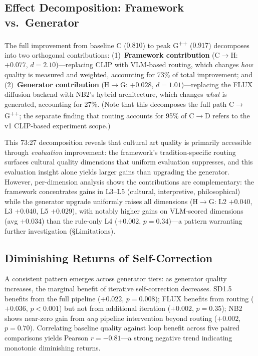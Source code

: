 \documentclass[sigconf, screen, review, anonymous]{acmart}
\newcommand{\Lx}[1]{L#1}
\begin{document}
\subsection{Effect Decomposition: Framework vs.\ Generator}

The full improvement from baseline C ($0.810$) to peak G\textsuperscript{++} ($0.917$) decomposes into two orthogonal contributions:
(1)~\textbf{Framework contribution} (C$\to$H: $+0.077$, $d = 2.10$)---replacing CLIP with VLM-based routing, which changes \emph{how} quality is measured and weighted, accounting for 73\% of total improvement; and
(2)~\textbf{Generator contribution} (H$\to$G: $+0.028$, $d = 1.01$)---replacing the FLUX diffusion backend with NB2's hybrid architecture, which changes \emph{what} is generated, accounting for 27\%.
(Note that this decomposes the full path C$\to$G\textsuperscript{++}; the separate finding that routing accounts for 95\% of C$\to$D refers to the v1 CLIP-based experiment scope.)

This 73:27 decomposition reveals that cultural art quality is primarily accessible through \emph{evaluation} improvement: the framework's tradition-specific routing surfaces cultural quality dimensions that uniform evaluation suppresses, and this evaluation insight alone yields larger gains than upgrading the generator.
However, per-dimension analysis shows the contributions are complementary: the framework concentrates gains in \Lx{3}--\Lx{5} (cultural, interpretive, philosophical) while the generator upgrade uniformly raises all dimensions (H$\to$G: \Lx{2} $+0.040$, \Lx{3} $+0.040$, \Lx{5} $+0.029$), with notably higher gains on VLM-scored dimensions (avg $+0.034$) than the rule-only \Lx{4} ($+0.002$, $p = 0.34$)---a pattern warranting further investigation (\S Limitations).

\subsection{Diminishing Returns of Self-Correction}

A consistent pattern emerges across generator tiers: as generator quality increases, the marginal benefit of iterative self-correction decreases.
SD1.5 benefits from the full pipeline ($+0.022$, $p = 0.008$); FLUX benefits from routing ($+0.036$, $p < 0.001$) but not from additional iteration ($+0.002$, $p = 0.35$); NB2 shows near-zero gain from \emph{any} pipeline intervention beyond routing ($+0.002$, $p = 0.70$).
Correlating baseline quality against loop benefit across five paired comparisons yields Pearson $r = -0.81$---a strong negative trend indicating monotonic diminishing returns.
\end{document}

